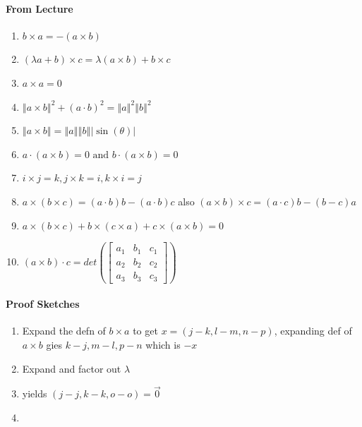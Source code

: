 \documentclass[11pt]{book}
\begin{document}
\paragraph{From Lecture} 
\begin{enumerate}
    \item $b\times a =  - \left( a\times b \right) $ 
    \item $\left( \lambda a + b \right) \times c = \lambda \left( a\times b \right)  + b\times c$ 
    \item $a\times a = 0$ 
    \item $\left\Vert a\times b \right\Vert^2  + \left( a \cdot b \right) ^2 = \left\Vert a \right\Vert ^2 \left\Vert b \right\Vert ^2 $ 
    \item $\left\Vert a\times b \right\Vert = \left\Vert a \right\Vert \left\Vert b \right\Vert \left| \sin  \left( \theta \right)  \right| $ 
    \item $a \cdot \left( a\times b \right) = 0 \text{ and } b \cdot \left( a\times b \right) = 0$ 
    \item $i\times j= k, j\times k= i, k\times i= j$ 
    \item $a\times \left( b\times c \right) = \left( a \cdot b \right) b - \left( a \cdot b \right) c$ also $\left( a\times b \right) \times c = \left( a \cdot c \right) b  -  \left( b - c \right) a$ 
    \item $a\times \left( b\times c \right)  + b\times \left( c\times a \right)  + c \times \left( a\times b \right) = 0$ 
    \item $\left( a\times b \right)  \cdot c = \mathit{det} \left(
            \begin{bmatrix}
            	a_{1}  &b_{1}   & c_{1}  \\
            	a_{2}  &b_{2}   & c_{2}  \\
            	a_{3}  &b_{3}   & c_{3}  
            \end{bmatrix}
        \right) $ 
\end{enumerate}

\paragraph{Proof Sketches}
\begin{enumerate}
    \item Expand the defn of $b\times a$  to get $x=\left( j  - k, l  -  m, n  - p \right) $, expanding def of $a\times b$ gies $k  - j, m  - l, p  - n $ which is $-x$ 
    \item Expand and factor out $\lambda $ 
    \item yields $\left( j  - j, k  - k, o  - o \right) = \vec{0}  $ 
    \item  {} 
\end{enumerate}
\end{document}
